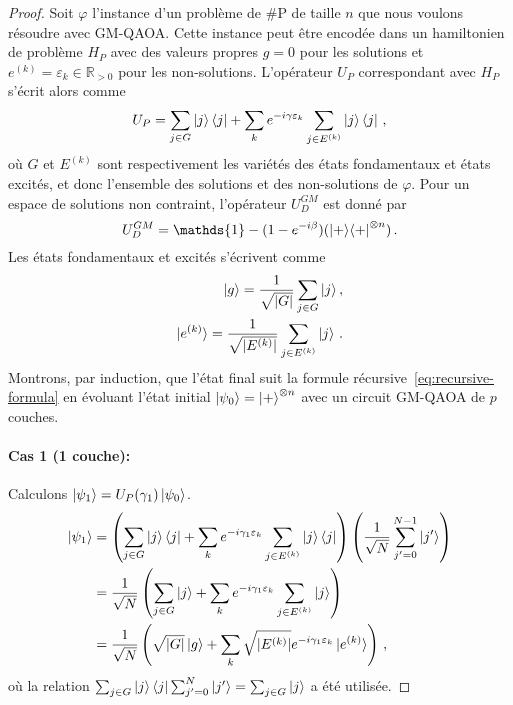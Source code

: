 \begin{proof}
Soit $\varphi$ l'instance d'un problème de \textsf{\#P} de taille $n$ que nous voulons résoudre avec GM-QAOA. Cette instance peut être encodée dans un hamiltonien de problème $H_{P}$ avec des valeurs propres $g = 0$ pour les solutions et $e^{(k)} = \varepsilon_{k} \in \mathbb{R}_{>0}$ pour les non-solutions. L'opérateur $U_{P}$ correspondant avec $H_{P}$ s'écrit alors comme
\begin{equation}
    U_{P} = \sum_{j \in G} \ket{j}\bra{j} + \sum_{k} e^{-i \gamma \varepsilon_{k}} \sum_{j \in E^{(k)}} \ket{j}\bra{j} \,,
\end{equation} 
où $G$ et $E^{(k)}$ sont respectivement les variétés des états fondamentaux et états excités, et donc l'ensemble des solutions et des non-solutions de $\varphi$. Pour un espace de solutions non contraint, l'opérateur $U_{D}^{GM}$ est donné par
\begin{equation}
    U_{D}^{GM} = \mathds{1} - (1 - e^{-i\beta}) (\ket{+}\!\bra{+}^{\otimes n}) \,.
\end{equation}
Les états fondamentaux et excités s'écrivent comme
\begin{align}
    \ket{g} = \frac{1}{\sqrt{ \lvert G \rvert }} \sum_{j \in G} \ket{j}, \\
    \ket{e^{(k)}} = \frac{1}{\sqrt{ \lvert E^{(k)} \rvert }} \sum_{j \in E^{(k)}} \ket{j} \,.
\end{align}
Montrons, par induction, que l'état final suit la formule récursive~\ref{eq:recursive-formula} en évoluant l'état initial $\ket{\psi_{0}} = \ket{+}^{\otimes n}$ avec un circuit GM-QAOA de $p$ couches. 

\paragraph{Cas 1 (1 couche):} Calculons $\ket{\psi_{1}} = U_{P}(\gamma_{1}) \ket{\psi_{0}}$.
\begin{equation}
\begin{aligned}
    \ket{\psi_{1}} & = \left(\sum_{j \in G} \ket{j}\bra{j} + \sum_{k} e^{-i \gamma_{1} \varepsilon_{k}} \sum_{j \in E^{(k)}} \ket{j}\bra{j} \right) \left( \frac{1}{ \sqrt{ N }} \sum_{j'=0}^{N-1} \ket{j'} \right) \\
    & = \frac{1}{ \sqrt{ N }} \left( \sum_{j \in G} \ket{j} + \sum_{k} e^{-i \gamma_{1} \varepsilon_{k}} \sum_{j \in E^{(k)}} \ket{j} \right) \\
    & = \frac{1}{ \sqrt{ N }} \left( \sqrt{ \lvert G \rvert  } \ket{g} + \sum_{k} \sqrt{ \lvert E^{(k)} \rvert  } e^{-i \gamma_{1} \varepsilon_{k}} \ket{e^{(k)}} \right) \,,
\end{aligned}
\end{equation}
où la relation $\sum_{j \in G}\ket{j}\bra{j} \sum_{j'=0}^{N} \ket{j'} = \sum_{j \in G} \ket{j}$ a été utilisée.


\end{proof}
